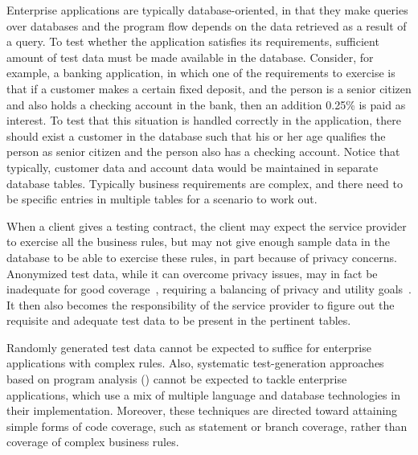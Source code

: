 
Enterprise applications are typically database-oriented, in that they make
queries over databases and the program flow depends on the data retrieved as a
result of a query.  To test whether the application satisfies its requirements,
sufficient amount of test data must be made available in the database. Consider,
for example, a banking application, in which one of the requirements to exercise
is that if a customer makes a certain fixed deposit, and the person is a senior
citizen and also holds a checking account in the bank, then an addition 0.25\%
is paid as interest. To test that this situation is handled correctly in the
application, there should exist a customer in the database such that his or her
age qualifies the person as senior citizen and the person also has a checking
account. Notice that typically, customer data and account data would be
maintained in separate database tables. Typically business requirements are
complex, and there need to be specific entries in multiple tables for a scenario
to work out.

When a client gives a testing contract, the client may expect the service
provider to exercise all the business rules, but may not give enough sample data
in the database to be able to exercise these rules, in part because of privacy
concerns. Anonymized test data, while it can overcome privacy issues, may in
fact be inadequate for good coverage~\cite{Grechanik:2010}, requiring a
balancing of privacy and utility goals~\cite{Taneja:2011}.  It then also becomes
the responsibility of the service provider to figure out the requisite and
adequate test data to be present in the pertinent tables.

Randomly generated test data cannot be expected to suffice for enterprise
applications with complex rules. Also, systematic test-generation approaches
based on program analysis (\eg \cite{Emmi:2007,Li:2010,Marcozzi:2012,Pan:2011})
cannot be expected to tackle enterprise applications, which use a mix of
multiple language and database technologies in their implementation. Moreover,
these techniques are directed toward attaining simple forms of code coverage,
such as statement or branch coverage, rather than coverage of complex business
rules.


